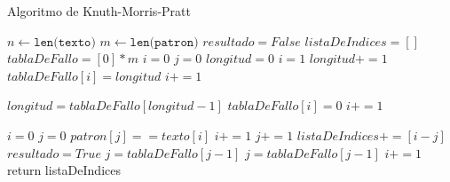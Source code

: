 \begin{algorithm} [H]
    \caption{Algoritmo de Knuth-Morris-Pratt}\label{alg:KMP}
    \begin{algorithmic} [1]
            \State $n \gets \texttt{len(texto)}$
            \State $m \gets \texttt{len(patron)}$
            \State $resultado = False$
            \State $listaDeIndices = []$
            \State $tablaDeFallo = [0]*m$ 
            \State $i = 0$
            \State $j = 0$
                \State $longitud = 0$ 
                \State $i = 1$
                        \State $longitud += 1$
                        \State $tablaDeFallo[i] = longitud$
                        \State $i += 1$
                    
                    \Else 
                            \State $longitud = tablaDeFallo[longitud-1]$
                        \Else
                            \State $tablaDeFallo[i] = 0$
                            \State $i += 1$
                        \EndIf

    \end{algorithmic}
\end{algorithm}

\begin{algorithm} [H]
    \begin{algorithmic} [1]
    \EndIf
    \EndWhile
\EndProcedure
{}
    \State $i = 0$
    \State $j = 0$
        \If $patron[j] == texto[i]$
            \State $i += 1$
            \State $j += 1$
            \EndIf
\State $listaDeIndices += [i-j]$
\State $resultado = True$
\State $j = tablaDeFallo[j-1]$
            \State $j = tablaDeFallo[j-1]$
        \Else 
            \State $i += 1$
        \EndIf
    \EndIf
    \EndWhile
    \EndProcedure
    \State return listaDeIndices
    \EndProcedure
        
    \end{algorithmic}
\end{algorithm}



